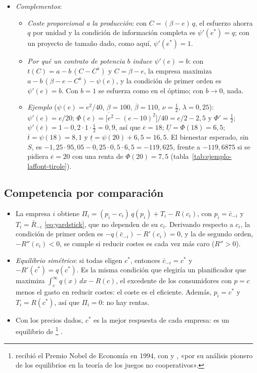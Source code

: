 \documentclass[11pt]{article}
\begin{document}
\begin{itemize}
\begin{itemize}
\end{itemize}
\item \emph{Complementos}:
\begin{itemize}
\item \emph{Coste proporcional a la producción}: con $C=(\beta-e)\,q$, el esfuerzo ahorra $q$ por unidad y la condición de información completa es $\psi'(e^{*})=q$\nocite{LaffontTirole1993Theory}; con un proyecto de tamaño dado, como aquí, $\psi'(e^{*})=1$.
\item \emph{Por qué un contrato de potencia $b$ induce $\psi'(e)=b$}: con $t(C)=a-b\,(C-C^a)$ y $C=\beta-e$, la empresa maximiza $a-b\,(\beta-e-C^a)-\psi(e)$, y la condición de primer orden es $\psi'(e)=b$. Con $b=1$ se esfuerza como en el óptimo; con $b\to0$, nada.\findemo
\item \emph{Ejemplo} ($\psi(e)=e^2/40$, $\underline{\beta}=100$, $\overline{\beta}=110$, $\nu=\tfrac12$, $\lambda=0{,}25$): $\psi'(e)=e/20$; $\Phi(e)=\big[e^2-(e-10)^2\big]/40=e/2-2{,}5$ y $\Phi'=\tfrac12$; $\psi'(\overline{e})=1-0{,}2\cdot 1\cdot\tfrac12=0{,}9$, así que $\overline{e}=18$; $\underline{U}=\Phi(18)=6{,}5$; $\overline{t}=\psi(18)=8{,}1$ y $\underline{t}=\psi(20)+6{,}5=16{,}5$. El bienestar esperado, sin $S$, es $-1{,}25\cdot 95{,}05-0{,}25\cdot 0{,}5\cdot 6{,}5=-119{,}625$, frente a $-119{,}6875$ si se pidiera $\overline{e}=20$ con una renta de $\Phi(20)=7{,}5$ (tabla~\ref{tab:ejemplo-laffont-tirole}).
\end{itemize}
\end{itemize}

\subsection{Competencia por comparación}\label{anexo:yardstick}

\begin{itemize}
\item La empresa $i$ obtiene $\Pi_i=(p_i-c_i)\,q(p_i)+T_i-R(c_i)$, con $p_i=\bar{c}_{-i}$ y $T_i=\bar{R}_{-i}$ \eqref{eq:yardstick}, que no dependen de su $c_i$. Derivando respecto a $c_i$, la condición de primer orden es $-q(\bar{c}_{-i})-R'(c_i)=0$, y la de segundo orden, $-R''(c_i)<0$, se cumple si reducir costes es cada vez más caro ($R''>0$).
\item \emph{Equilibrio simétrico}: si todas eligen $c^{*}$, entonces $\bar{c}_{-i}=c^{*}$ y $-R'(c^{*})=q(c^{*})$. Es la misma condición que elegiría un planificador que maximiza $\int_{c}^{\infty}q(x)\,dx-R(c)$, el excedente de los consumidores con $p=c$ menos el gasto en reducir costes: el coste es el eficiente. Además, $p_i=c^{*}$ y $T_i=R(c^{*})$, así que $\Pi_i=0$: no hay rentas.
\item Con los precios dados, $c^{*}$ es la mejor respuesta de cada empresa: es un equilibrio de \footnote{ recibió el Premio Nobel de Economía en 1994, con  y , «por su análisis pionero de los equilibrios en la teoría de los juegos no cooperativos»\nocite{Nobel1994Nash}.} .\findemo
\end{itemize}
\end{document}
